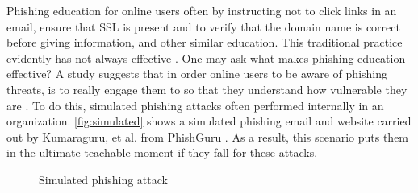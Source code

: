 Phishing education for online users often by instructing not to click
links in an email, ensure that SSL is present and to verify that the
domain name is correct before giving information, and other similar
education. This traditional practice evidently has not always effective
\citep{emigh:2005}. One may ask what makes phishing education effective?
A study suggests that in order online users to be aware of phishing
threats, is to really engage them to so that they understand how vulnerable
they are \citep{mansfield:2013}. To do this, simulated phishing attacks
often performed internally in an organization. \autoref{fig:simulated}
shows a simulated phishing email and website carried out by Kumaraguru,
et al. from PhishGuru \citep{kumaraguru:2009}. As a result, this
scenario puts them in the ultimate teachable moment if they fall for
these attacks.

\begin{figure}



\quad{}\quad{}\protect\caption{\label{fig:simulated}Simulated phishing attack \citep{kumaraguru:2009}}


\end{figure}


